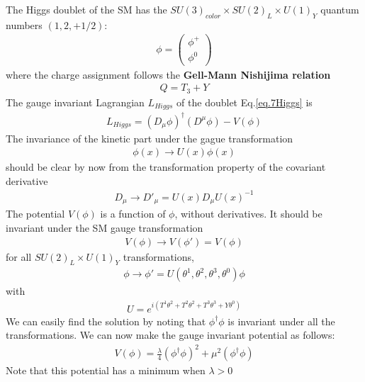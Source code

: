 \documentclass[12pt]{article}
\begin{document}
  The Higgs doublet of the SM has the
  $SU(3)_{color} \times SU(2)_L \times U(1)_Y$ quantum numbers
  $(1, 2, +1/2)$:
  \begin{eqnarray}
    \phi= 
    \begin{pmatrix}
      \phi^+ \\ \phi^0
    \end{pmatrix} \label{eq.7Higgs}
  \end{eqnarray}
   where the charge assignment follows the {\bf Gell-Mann Nishijima
  relation} 
\begin{eqnarray}
  Q = T_3 + Y \label{eq.7charge}
\end{eqnarray}
  The gauge invariant Lagrangian $L_{Higgs}$ of the doublet Eq.\ref{eq.7Higgs} is
  \begin{eqnarray}
    L_{Higgs} = (D_\mu \phi)^\dagger (D^\mu \phi) - V(\phi)
  \end{eqnarray}
   The invariance of the kinetic part under the gague
  transformation
\begin{eqnarray}
  \phi(x) \to U(x) \phi(x)
\end{eqnarray}
  should be clear by now from the transformation property of
  the covariant derivative
\begin{eqnarray}
  D_\mu \to D'_\mu = U(x) D_\mu U(x)^{-1}
\end{eqnarray}
  The potential $V(\phi)$ is a function of $\phi$, without
  derivatives.  It should be invariant under the SM gauge
  transformation
\begin{eqnarray}
  V(\phi) \to V(\phi') = V(\phi)
\end{eqnarray}
 for all $SU(2)_L \times U(1)_Y$ transformations,
 \begin{eqnarray}
  \phi \to \phi' = U(\theta^1,\theta^2,\theta^3,\theta^0) \phi
 \end{eqnarray}
  with
\begin{eqnarray}
  U = e^{i(T^1\theta^2 +T^2\theta^2 +T^3\theta^3 +Y\theta^0)}
\end{eqnarray}
  We can easily find the solution by noting that $\phi^\dagger \phi$
  is invariant under all the transformations. We can now make
  the gauge invariant potential as follows:
\begin{eqnarray}
  V(\phi) = \frac{\lambda}{4} (\phi^\dagger \phi)^2
  + \mu^2 (\phi^\dagger \phi)
\end{eqnarray}
 Note that this potential has a minimum when $\lambda > 0$
\end{document}
